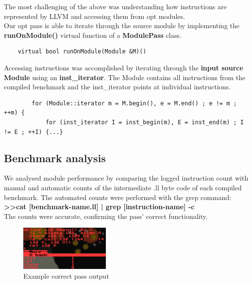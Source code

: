 The most challenging of the above was understanding how instructions are represented by LLVM and accessing them from opt modules.\\

Our opt pass is able to iterate through the source module by implementing the \textbf{runOnModule()} virtual function of a \textbf{ModulePass} class.

\begin{frame}[fragile]
\begin{lstlisting}
    virtual bool runOnModule(Module &M)()
\end{lstlisting}
\end{frame}

Accessing instructions was accomplished by iterating through the \textbf{input source} \textbf{Module} using an \textbf{inst\_iterator}. The Module contains all instructions from the compiled benchmark and the inst\_iterator points at individual instructions.\\

\begin{frame}[fragile]
\begin{lstlisting}
    	for (Module::iterator m = M.begin(), e = M.end() ; e != m ; ++m) {
			for (inst_iterator I = inst_begin(m), E = inst_end(m) ; I != E ; ++I) {...}
\end{lstlisting}
\end{frame}


\subsection{Benchmark analysis}
We analysed module performance by comparing the logged instruction count with manual and automatic counts of the intermediate .ll byte code of each compiled benchmark. The automated counts were performed with the grep command:\\
\textbf{>>cat [benchmark-name.ll] | grep [instruction-name] -c}\\
The counts were accurate, confirming the pass' correct functionality.
\begin{figure}[here]
\includegraphics[width=0.4\textwidth]{StaticInst}
\caption{Example correct pass output}
\label{StaticInstCount}
\end{figure}

